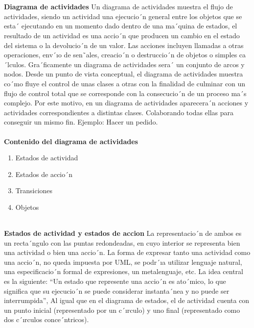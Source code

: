 \documentclass[conference,compsoc,onecolumn]{IEEEtran}
\begin{document}
\\
\\
\textbf{Diagrama de actividades} Un diagrama de actividades muestra el flujo de actividades, siendo un actividad una ejecucio´n general entre los objetos que se esta´  ejecutando en un momento dado dentro de una ma´quina de estados, el resultado de un actividad es una accio´n que producen un cambio en el estado del sistema o la devolucio´n de un valor.  Las  acciones  incluyen  llamadas  a  otras  operaciones,  env´ıo  de  sen˜ales,  creacio´n  o  destruccio´n  de  objetos  o simples ca´lculos. Gra´ficamente un diagrama de actividades sera´  un conjunto de arcos y nodos. Desde un punto de vista conceptual, el diagrama de actividades muestra co´mo fluye el control de unas clases a otras con la finalidad de culminar con un flujo de control total que se corresponde con la consecucio´n de un proceso ma´s complejo. Por este  motivo,  en  un  diagrama  de  actividades  aparecera´n  acciones  y  actividades  correspondientes  a  distintas  clases. Colaborando todas ellas para conseguir un mismo fin. Ejemplo: Hacer un pedido.
\\
\\
\textbf{Contenido del diagrama de actividades} 
\begin{enumerate}
    \item Estados de actividad
    \item Estados de accio´n
    \item Transiciones
    \item Objetos
    \\
    \\
\end{enumerate}
\textbf{Estados de actividad y estados de accion} La representacio´n de ambos es un recta´ngulo con las puntas redondeadas, en  cuyo  interior  se  representa  bien  una  actividad  o  bien  una  accio´n.  La  forma  de  expresar  tanto  una  actividad como  una  accio´n,  no  queda  impuesta  por  UML,  se  podr´ıa  utilizar  lenguaje  natural,  una  especificacio´n  formal  de expresiones, un metalenguaje, etc. La idea central es la siguiente: “Un estado que represente una accio´n es ato´mico, lo  que  significa  que  su  ejecucio´n  se  puede  considerar  instanta´nea  y  no  puede  ser  interrumpida”,  Al  igual  que en el diagrama de estados, el de actividad cuenta con un punto inicial (representado por un c´ırculo) y uno final (representado como dos c´ırculos conce´ntricos).
\\
\\
\end{document}
